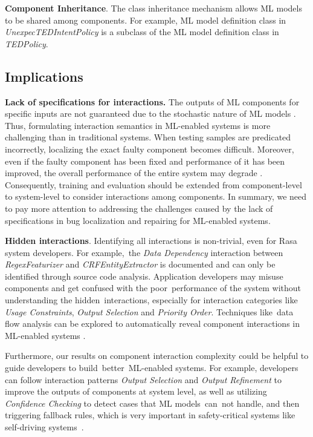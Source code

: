\textbf{Component Inheritance}. The class inheritance mechanism allows ML models to be shared among components. For example, ML model definition class  in \textit{UnexpecTEDIntentPolicy} is a subclass of the ML model definition class in \textit{TEDPolicy}.

\subsection{Implications}


\textbf{Lack of specifications for interactions.} The outputs of ML components for specific inputs are not guaranteed due to the stochastic nature of ML models  \cite{feature_interaction}. Thus, formulating interaction semantics in ML-enabled systems is more challenging than in traditional systems. When testing samples are predicated incorrectly, localizing the exact faulty component becomes difficult. 
Moreover, even if the faulty component has been fixed and performance of it has been improved, the overall performance of the entire system may degrade \cite{fix_that_fails}. Consequently, training and evaluation should be extended from component-level to system-level to consider interactions among components. 
In summary, we need to pay more attention to addressing the challenges caused by the lack of specifications in bug localization and repairing for ML-enabled systems.

\textbf{Hidden interactions}. Identifying all interactions is non-trivial, even for Rasa system developers. 
For example,~the \textit{Data Dependency} interaction between \textit{RegexFeaturizer} and \textit{CRFEntityExtractor} is documented and can only be identified through source code analysis.
Application developers may misuse components and get confused with the poor~performance of the system without understanding the hidden~interactions, especially for interaction categories like \textit{Usage Constraints}, \textit{Output Selection} and \textit{Priority Order}.
Techniques like~data flow analysis can be explored to automatically reveal component interactions in ML-enabled systems \cite{Sattler2017LiftingID}.

Furthermore, our results on component interaction complexity could be helpful to guide developers to build~better~ML-enabled systems.
For example, developers can follow interaction patterns \textit{Output Selection} and \textit{Output Refinement} to improve the outputs of components at system level, as well as utilizing  \textit{Confidence Checking} to detect cases that ML models~can~not handle, and then triggering fallback rules, which is very important in safety-critical systems like self-driving systems~\cite{pengFirstLookIntegration2020}.



